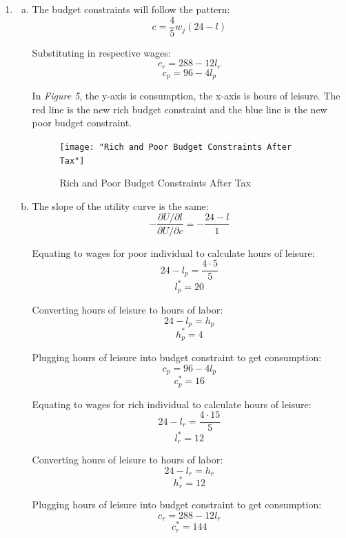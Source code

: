 \documentclass{article}
\begin{document}
\begin{enumerate}[1.]
\begin{enumerate}[a.]
        \end{enumerate}

    \item 
        \begin{enumerate}[a.]
            \item The budget constraints will follow the pattern:
                $$ c = \frac{ 4 }{ 5 } w_{j} ( 24 - l ) $$

                Substituting in respective wages:
                $$ c_{r} = 288 - 12l_{r} $$
                $$ c_{p} = 96 - 4l_{p} $$

                In \textit{Figure 5}, the y-axis is consumption, the x-axis is
                hours of leisure. The red line is the new rich budget constraint and
                the blue line is the new poor budget constraint.

                \begin{figure}[H]
                    \centering
                    \texttt{[image: "Rich and Poor Budget
                    Constraints After Tax"]}
                    \caption{Rich and Poor Budget Constraints After Tax}
                \end{figure}

            \item The slope of the utility curve is the same:
               $$ -\frac{ \partial U / \partial l }{ \partial U / \partial c }
                = -\frac{ 24 - l }{ 1 }$$

                Equating to wages for poor individual to calculate hours of
                leisure:
                $$ 24 - l_{p} = \frac{ 4 \cdot 5 }{ 5 } $$
                $$ l_{p}^{*} = 20 $$

                Converting hours of leisure to hours of labor:
                $$ 24 - l_{p} = h_{p} $$
                $$ h_{p}^{*} = 4 $$

                Plugging hours of leisure into budget constraint to get
                consumption:
                $$ c_{p} = 96 - 4l_{p} $$
                $$ c_{p}^{*} =  16$$

                Equating to wages for rich individual to calculate hours of
                leisure:
                $$ 24 - l_{r} = \frac{ 4 \cdot 15 }{ 5 } $$
                $$ l_{r}^{*} = 12 $$

                Converting hours of leisure to hours of labor:
                $$ 24 - l_{r} = h_{r} $$
                $$ h_{r}^{*} = 12 $$

                Plugging hours of leisure into budget constraint to get
                consumption:
                $$ c_{r} = 288 - 12 l_{r} $$
                $$ c_{r}^{*} = 144 $$


\end{enumerate}
\end{enumerate}
\end{document}
